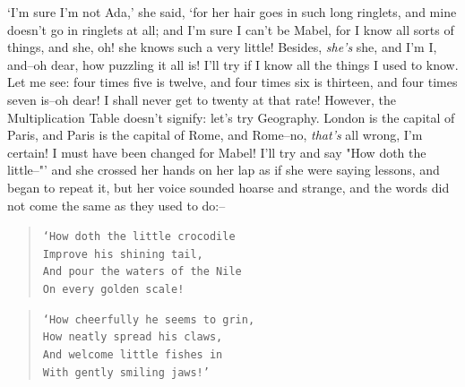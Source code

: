 \documentclass{article}
\begin{document}

`I'm sure I'm not Ada,' she said, `for her hair goes in such long ringlets, and mine doesn't go in ringlets at all; and I'm sure I can't be Mabel, for I know all sorts of things, and she, oh! she knows such a very little! Besides, \textit{she's} she, and I'm I, and--oh dear, how puzzling it all is! I'll try if I know all the things I used to know. Let me see: four times five is twelve, and four times six is thirteen, and four times seven is--oh dear! I shall never get to twenty at that rate! However, the Multiplication Table doesn't signify: let's try Geography. London is the capital of Paris, and Paris is the capital of Rome, and Rome--no, \textit{that's} all wrong, I'm certain! I must have been changed for Mabel! I'll try and say "How doth the little--"' and she crossed her hands on her lap as if she were saying lessons, and began to repeat it, but her voice sounded hoarse and strange, and the words did not come the same as they used to do:--

\newpage

\begin{verse}

\texttt{`How doth the little crocodile}\\
\hspace{1em}\texttt{Improve his shining tail,}\\
\texttt{And pour the waters of the Nile}\\
\hspace{1em}\texttt{On every golden scale!}\\

\end{verse}
\begin{verse}

\texttt{`How cheerfully he seems to grin,}\\
\hspace{1em}\texttt{How neatly spread his claws,}\\
\texttt{And welcome little fishes in}\\
\hspace{1em}\texttt{With gently smiling jaws!'}

\end{verse}
\end{document}

